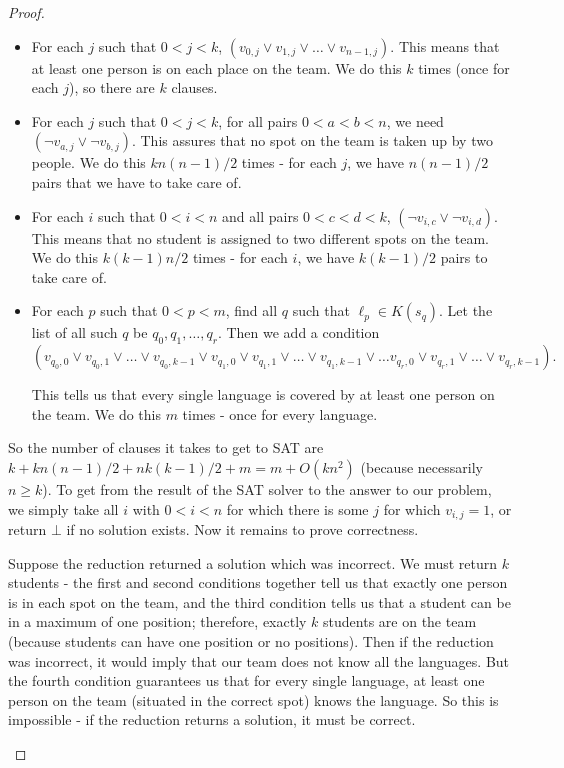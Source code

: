\documentclass[11pt]{article}
\begin{document}
\begin{enumerate}
\begin{proof}
\begin{enumerate}
\begin{itemize}
\item For each $j$ such that $0 < j < k$, $(v_{0, j} \vee v_{1, j} \vee \dots \vee v_{n  - 1, j})$. This means that at least one person is on each place on the team. We do this $k$ times (once for each $j$), so there are $k$ clauses.

\item For each $j$ such that $0 < j < k$, for all pairs $0 < a < b < n$, we need $(\neg v_{a, j} \vee \neg v_{b, j})$. This assures that no spot on the team is taken up by two people. We do this $kn(n - 1)/2$ times - for each $j$, we have $n(n - 1)/2$ pairs that we have to take care of.

\item For each $i$ such that $0 < i < n$ and all pairs $0 < c < d < k$, $(\neg v_{i, c} \vee \neg v_{i, d})$. This means that no student is assigned to two different spots on the team. We do this $k(k - 1)n/2$ times - for each $i$, we have $k(k - 1)/2$ pairs to take care of.

\item For each $p$ such that $0 < p < m$, find all $q$ such that $\ell_p \in K(s_q)$. Let the list of all such $q$ be $q_0, q_1, \dots, q_r$. Then we add a condition 
$$
(v_{q_0, 0} \vee v_{q_0, 1} \vee \dots \vee v_{q_0, k - 1} \vee v_{q_1, 0} \vee v_{q_1, 1} \vee \dots \vee v_{q_1, k - 1} \vee \dots v_{q_r, 0} \vee v_{q_r, 1}\vee \dots \vee v_{q_r, k - 1}).
$$

This tells us that every single language is covered by at least one person on the team. We do this $m$ times - once for every language.
\end{itemize}

So the number of clauses it takes to get to SAT are $k + kn(n - 1)/2 + nk(k - 1)/2 + m = m + O(kn^2)$ (because necessarily $n \geq k$). To get from the result of the SAT solver to the answer to our problem, we simply take all $i$ with $0 < i < n$ for which there is some $j$ for which $v_{i, j} = 1$, or return $\bot$ if no solution exists. Now it remains to prove correctness. 

Suppose the reduction returned a solution which was incorrect. We must return $k$ students - the first and second conditions together tell us that exactly one person is in each spot on the team, and the third condition tells us that a student can be in a maximum of one position; therefore, exactly $k$ students are on the team (because students can have one position or no positions). Then if the reduction was incorrect, it would imply that our team does not know all the languages. But the fourth condition guarantees us that for every single language, at least one person on the team (situated in the correct spot) knows the language. So this is impossible - if the reduction returns a solution, it must be correct.


\end{enumerate}
\end{proof}
\end{enumerate}
\end{document}
